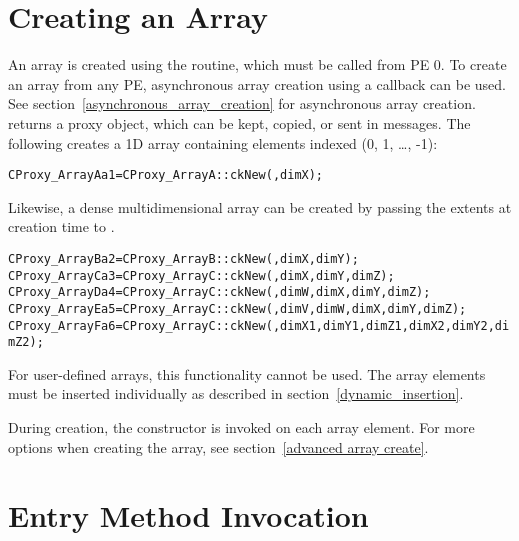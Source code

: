 \section{Creating an Array}
\label{basic array creation}

An array is created using the  routine, which must
be called from PE 0. To create an array from any PE, asynchronous array creation
using a callback can be used. See section~\ref{asynchronous_array_creation} for
asynchronous array creation.  returns a proxy object,
which can be kept, copied, or sent in messages. The following creates a
1D array containing elements indexed (0, 1, \ldots, -1):
%
\begin{alltt}
CProxy_ArrayA a1 = CProxy_ArrayA::ckNew(, dimX);
\end{alltt}
%
Likewise, a dense multidimensional array can be created by passing the extents
at creation time to .
%
\begin{alltt}
CProxy_ArrayB a2 = CProxy_ArrayB::ckNew(, dimX, dimY);
CProxy_ArrayC a3 = CProxy_ArrayC::ckNew(, dimX, dimY, dimZ);
CProxy_ArrayD a4 = CProxy_ArrayC::ckNew(, dimW, dimX, dimY, dimZ);
CProxy_ArrayE a5 = CProxy_ArrayC::ckNew(, dimV, dimW, dimX, dimY, dimZ);
CProxy_ArrayF a6 = CProxy_ArrayC::ckNew(, dimX1, dimY1, dimZ1, dimX2, dimY2, dimZ2);
\end{alltt}
%
For user-defined arrays, this functionality cannot be used.  The
array elements must be inserted individually as described in
section~\ref{dynamic_insertion}.

During creation, the constructor is invoked on each array element. For more
options when creating the array, see section~\ref{advanced array create}.

\section{Entry Method Invocation}

